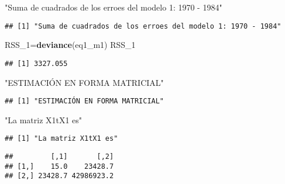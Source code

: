 \documentclass[
]{article}
\newenvironment{Shaded}{\begin{snugshade}}{\end{snugshade}}
\newcommand{\DataTypeTok}[1]{\textcolor[rgb]{0.13,0.29,0.53}{#1}}
\newcommand{\DecValTok}[1]{\textcolor[rgb]{0.00,0.00,0.81}{#1}}
\newcommand{\KeywordTok}[1]{\textcolor[rgb]{0.13,0.29,0.53}{\textbf{#1}}}
\newcommand{\NormalTok}[1]{#1}
\newcommand{\OperatorTok}[1]{\textcolor[rgb]{0.81,0.36,0.00}{\textbf{#1}}}
\newcommand{\StringTok}[1]{\textcolor[rgb]{0.31,0.60,0.02}{#1}}
\begin{document}
\begin{Shaded}
\begin{Highlighting}[]
\StringTok{"Suma de cuadrados de los erroes del modelo 1: 1970 - 1984"}
\end{Highlighting}
\end{Shaded}

\begin{verbatim}
## [1] "Suma de cuadrados de los erroes del modelo 1: 1970 - 1984"
\end{verbatim}

\begin{Shaded}
\begin{Highlighting}[]
\NormalTok{RSS_}\DecValTok{1}\NormalTok{=}\KeywordTok{deviance}\NormalTok{(eq1_m1)}
\NormalTok{RSS_}\DecValTok{1}
\end{Highlighting}
\end{Shaded}

\begin{verbatim}
## [1] 3327.055
\end{verbatim}

\begin{Shaded}
\begin{Highlighting}[]
\StringTok{"ESTIMACIÓN EN FORMA MATRICIAL"}
\end{Highlighting}
\end{Shaded}

\begin{verbatim}
## [1] "ESTIMACIÓN EN FORMA MATRICIAL"
\end{verbatim}

\begin{Shaded}
\begin{Highlighting}[]
\StringTok{"La matriz X1tX1 es"}
\end{Highlighting}
\end{Shaded}

\begin{verbatim}
## [1] "La matriz X1tX1 es"
\end{verbatim}

\begin{Shaded}
\end{Shaded}

\begin{verbatim}
##         [,1]       [,2]
## [1,]    15.0    23428.7
## [2,] 23428.7 42986923.2
\end{verbatim}
\end{document}
